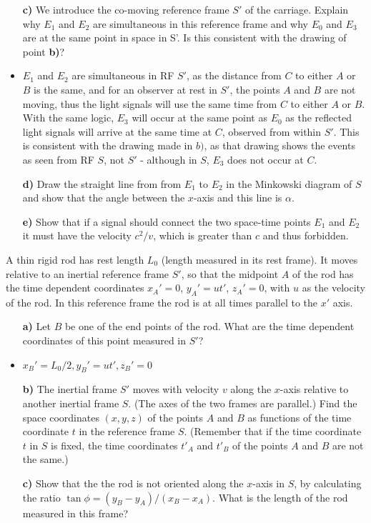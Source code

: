 \documentclass[11pt,a4paper]{report}
\newcounter{excount}[chapter]
\newenvironment{exercise}[1][]{\addtocounter{excount}{1} \noindent {\bf Problem
    \arabic{excount} \ \ #1}\hspace{2mm}}{\vspace{4mm}}
\begin{document}
\begin{exercise}
\begin{itemize}
\item[\bf c)] We introduce the co-moving reference frame $S'$ of the carriage. Explain why $E_1$ and $E_2$ are simultaneous in this reference frame and why $E_0$ and $E_3$ are at the same point in space in S'. Is this consistent with the drawing of point {\bf b)}?

\item $E_1$ and $E_2$ are simultaneous in RF $S'$, as the distance from $C$ to either $A$ or $B$ is the same, and for an observer at rest in $S'$, the points $A$ and $B$ are not moving, thus the light signals will use the same time from $C$ to either $A$ or $B$. With the same logic, $E_3$ will occur at the same point as $E_0$ as the reflected light signals will arrive at the same time at $C$, observed from within $S'$. This is consistent with the drawing made in $b)$, as that drawing shows the events as seen from RF $S$, not $S'$ - although in $S$, $E_3$ does not occur at $C$.

\item[\bf d)] Draw the straight line from from $E_1$ to $E_2$ in the Minkowski diagram of $S$ and show that the angle between the $x$-axis and this line is $\alpha$. 
\item[\bf e)] Show that if a signal should connect the two space-time points $E_1$ and $E_2$ it must have the velocity $c^2/v$, which is greater than $c$ and thus forbidden.
\end{itemize}
\end{exercise}


\begin{exercise}
 A thin rigid rod has rest length $L_0$ (length measured in its rest frame). It moves relative to an inertial reference frame $S'$, so that the midpoint $A$ of the rod has the time dependent coordinates $x_A'=0$, $y_A'=u t'$, $z_A'=0$, with $u$ as the velocity of the rod. In this reference frame the rod is at all times parallel to the $x'$ axis.
 
 
\begin{itemize}

\item[\bf a)] Let $B$ be one of the end points of the rod. What are the time dependent coordinates of this point measured in $S'$?


\item $x_B'=L_0/2, y_B'=ut',z_B'=0$

\item[\bf b)]The inertial frame $S'$ moves with velocity $v$ along the $x$-axis relative to another inertial frame $S$. (The axes of the two frames are parallel.) Find the space coordinates $(x,y,z)$ of the points $A$ and $B$ as functions of the time coordinate $t$  in the reference frame $S$. 
 (Remember that if the time coordinate $t$ in $S$ is fixed, the time coordinates $t'_A$ and $t'_B$ of the points $A$ and $B$ are not the same.)
\item[\bf c)]Show that the the rod is not oriented along the $x$-axis in $S$, by calculating the ratio $\tan\phi=(y_B-y_A)/(x_B-x_A)$. What is  the length of the rod measured in this frame?
\end{itemize}
\end{exercise}
 
 
\end{document}
